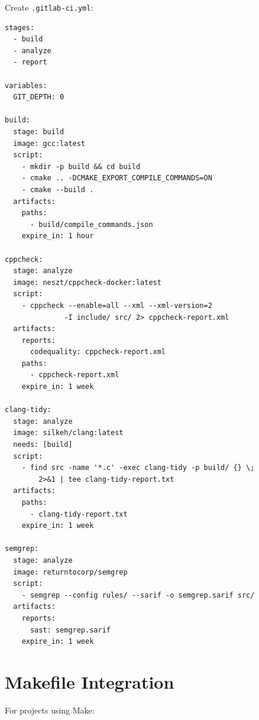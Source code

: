 \documentclass[11pt,letterpaper]{report}
\begin{document}
Create \texttt{.gitlab-ci.yml}:

\begin{verbatim}
stages:
  - build
  - analyze
  - report

variables:
  GIT_DEPTH: 0

build:
  stage: build
  image: gcc:latest
  script:
    - mkdir -p build && cd build
    - cmake .. -DCMAKE_EXPORT_COMPILE_COMMANDS=ON
    - cmake --build .
  artifacts:
    paths:
      - build/compile_commands.json
    expire_in: 1 hour

cppcheck:
  stage: analyze
  image: neszt/cppcheck-docker:latest
  script:
    - cppcheck --enable=all --xml --xml-version=2
              -I include/ src/ 2> cppcheck-report.xml
  artifacts:
    reports:
      codequality: cppcheck-report.xml
    paths:
      - cppcheck-report.xml
    expire_in: 1 week

clang-tidy:
  stage: analyze
  image: silkeh/clang:latest
  needs: [build]
  script:
    - find src -name '*.c' -exec clang-tidy -p build/ {} \;
        2>&1 | tee clang-tidy-report.txt
  artifacts:
    paths:
      - clang-tidy-report.txt
    expire_in: 1 week

semgrep:
  stage: analyze
  image: returntocorp/semgrep
  script:
    - semgrep --config rules/ --sarif -o semgrep.sarif src/
  artifacts:
    reports:
      sast: semgrep.sarif
    expire_in: 1 week
\end{verbatim}

\section{Makefile Integration}

For projects using Make:
\end{document}
